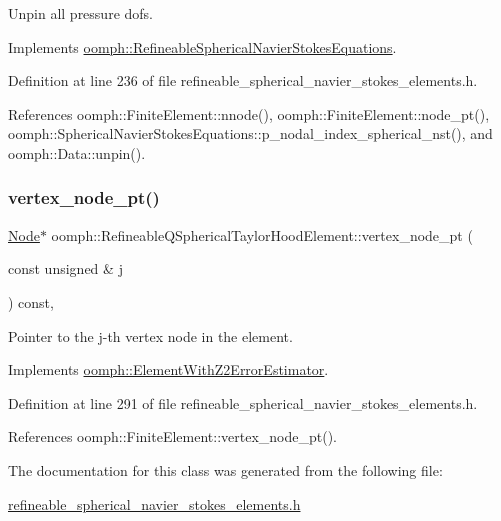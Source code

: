 Unpin all pressure dofs. 



Implements \hyperlink{classoomph_1_1RefineableSphericalNavierStokesEquations_a6d4b7f91dc9139367408a3b9f067920d}{oomph\+::\+Refineable\+Spherical\+Navier\+Stokes\+Equations}.



Definition at line 236 of file refineable\+\_\+spherical\+\_\+navier\+\_\+stokes\+\_\+elements.\+h.



References oomph\+::\+Finite\+Element\+::nnode(), oomph\+::\+Finite\+Element\+::node\+\_\+pt(), oomph\+::\+Spherical\+Navier\+Stokes\+Equations\+::p\+\_\+nodal\+\_\+index\+\_\+spherical\+\_\+nst(), and oomph\+::\+Data\+::unpin().

\mbox{\label{classoomph_1_1RefineableQSphericalTaylorHoodElement_a9075467fb311c04ce1dfec15946e7162}} 
\subsubsection{\texorpdfstring{vertex\+\_\+node\+\_\+pt()}{vertex\_node\_pt()}}
{\footnotesize\ttfamily \hyperlink{classoomph_1_1Node}{Node}$\ast$ oomph\+::\+Refineable\+Q\+Spherical\+Taylor\+Hood\+Element\+::vertex\+\_\+node\+\_\+pt (\begin{DoxyParamCaption}\item[{const unsigned \&}]{j }\end{DoxyParamCaption}) const\hspace{0.3cm}{\ttfamily [inline]}, {\ttfamily [virtual]}}



Pointer to the j-\/th vertex node in the element. 



Implements \hyperlink{classoomph_1_1ElementWithZ2ErrorEstimator_a0eedccc33519f852c5dc2055ddf2774b}{oomph\+::\+Element\+With\+Z2\+Error\+Estimator}.



Definition at line 291 of file refineable\+\_\+spherical\+\_\+navier\+\_\+stokes\+\_\+elements.\+h.



References oomph\+::\+Finite\+Element\+::vertex\+\_\+node\+\_\+pt().



The documentation for this class was generated from the following file\+:\begin{DoxyCompactItemize}
\item 
\hyperlink{refineable__spherical__navier__stokes__elements_8h}{refineable\+\_\+spherical\+\_\+navier\+\_\+stokes\+\_\+elements.\+h}\end{DoxyCompactItemize}
